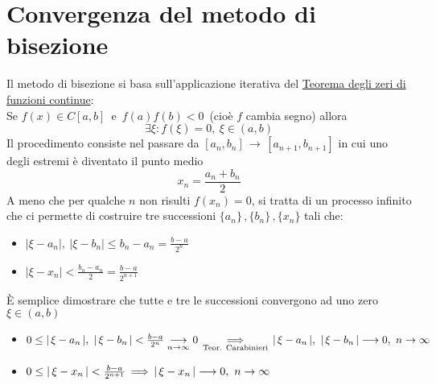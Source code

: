 \section{Convergenza del metodo di bisezione}
Il metodo di bisezione si basa sull'applicazione iterativa del \underline{Teorema degli zeri di funzioni continue}:\\
Se $f(x) \in C[a,b]\,$ e $\,f(a)f(b)<0 \,$ (cioè $f$ cambia segno) allora
\[\exists \xi : f(\xi)=0, \ \xi \in (a,b)\]
Il procedimento consiste nel passare da $[a_n,b_n] \, \rightarrow \, [a_{n+1},b_{n+1}]$ in cui uno degli estremi è diventato il punto medio
\[
x_n=\frac{a_n+b_n}{2}
\]
A meno che per qualche $n$ non risulti $f(x_n)=0$, si tratta di un processo infinito che ci permette di costruire tre successioni $\{a_n\}\,,\{b_n\}\,,\{x_n\}$ tali che:
\begin{itemize}
    \item $|\xi - a_n|, \ |\xi - b_n| \leq b_n-a_n=\frac{b-a}{2^n}$
	\item $|\xi - x_n| < \frac{b_n - a_n}{2} = \frac{b-a}{2^{n+1}}$
\end{itemize}
È semplice dimostrare che tutte e tre le successioni convergono ad uno zero $\xi \in (a,b)$
\begin{itemize}
	\item $0 \le \abs{\,\xi - a_n\,}, \ \abs{\,\xi - b_n\,} < \frac{b-a}{2^n}\underset{n\to \infty}{\longrightarrow}  0 \, \underset{\text{Teor. Carabinieri}}{\Longrightarrow} \, \abs{\,\xi - a_n\,}, \ \abs{\,\xi - b_n\,} \longrightarrow 0, \ n \rightarrow \infty$
	\item $0 \le \lvert\,\xi - x_n\,\rvert < \frac{b-a}{2^{n+1}} \, \Longrightarrow \,\lvert\,\xi - x_n\,\rvert \longrightarrow 0, \ n \rightarrow \infty$
\end{itemize}

